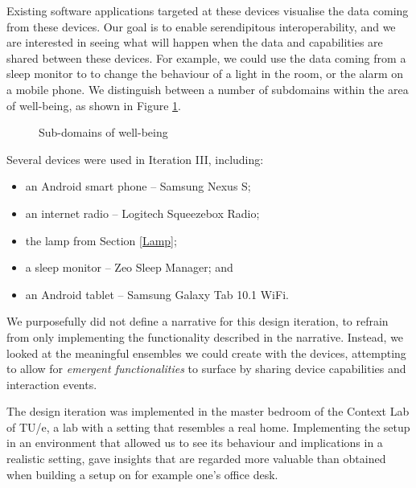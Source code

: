 Existing software applications targeted at these devices visualise the data coming from these devices. Our goal is to enable serendipitous interoperability, and we are interested in seeing what will happen when the data and capabilities are shared between these devices. For example, we could use the data coming from a sleep monitor to to change the behaviour of a light in the room, or the alarm on a mobile phone. We distinguish between a number of subdomains within the area of well-being, as shown in Figure \ref{Wellbeing}.

\begin{figure}[bth]
\begin{center}
	\caption{Sub-domains of well-being}
	\label{Wellbeing}        
\end{center}
\end{figure}

Several devices were used in Iteration III, including:

\begin{itemize}
	\item an Android smart phone -- Samsung Nexus S;
	\item an internet radio -- Logitech Squeezebox Radio;
	\item the lamp from Section \ref{Lamp};
	\item a sleep monitor -- Zeo Sleep Manager; and 
	\item an Android tablet -- Samsung Galaxy Tab 10.1 WiFi.
\end{itemize}

We purposefully did not define a narrative for this design iteration, to refrain from only implementing the functionality described in the narrative. Instead, we looked at the meaningful ensembles we could create with the devices, attempting to allow for \emph{emergent functionalities} to surface by sharing device capabilities and interaction events.

The design iteration was implemented in the master bedroom of the Context Lab of TU/e, a lab with a setting that resembles a real home. Implementing the setup in an environment that allowed us to see its behaviour and implications in a realistic setting, gave insights that are regarded more valuable than obtained when building a setup on for example one's office desk. 


